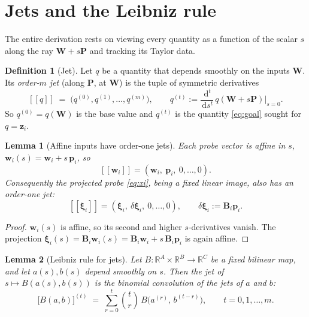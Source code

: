 \documentclass[11pt]{article}
\newcommand{\R}{\mathbb{R}}
\newcommand{\jet}[1]{[\![ #1 ]\!]}   %
\newcommand{\dd}[1]{\,\mathrm{d}#1}
\theoremstyle{definition}
\newtheorem{definition}{Definition}
\theoremstyle{plain}
\newtheorem{lemma}{Lemma}
\begin{document}
\section{Jets and the Leibniz rule}
\label{sec:jets}

The entire derivation rests on viewing every quantity as a function of the scalar $s$ along the ray
$\mathbf W + s\mathbf P$ and tracking its Taylor data.

\begin{definition}[Jet]
\label{def:jet}
Let $q$ be a quantity that depends smoothly on the inputs $\mathbf W$. Its \emph{order-$m$ jet}
(along $\mathbf P$, at $\mathbf W$) is the tuple of symmetric derivatives
\[
  \jet{q} \;=\; \big(q^{(0)}, q^{(1)}, \dots, q^{(m)}\big),
  \qquad
  q^{(t)} := \frac{\dd{^t}}{\dd s^t}\, q(\mathbf W + s\mathbf P)\Big|_{s=0}.
\]
So $q^{(0)} = q(\mathbf W)$ is the base value and $q^{(t)}$ is the quantity \eqref{eq:goal} sought
for $q = \mathbf z_i$.
\end{definition}

\begin{lemma}[Affine inputs have order-one jets]
\label{lem:affine}
Each probe vector is affine in $s$, $\mathbf w_i(s) = \mathbf w_i + s\,\mathbf p_i$, so
\[
  \jet{\mathbf w_i} = (\mathbf w_i,\ \mathbf p_i,\ 0, \dots, 0).
\]
Consequently the projected probe \eqref{eq:xi}, being a fixed linear image, also has an order-one
jet:
\[
  \jet{\boldsymbol\xi_i} = (\boldsymbol\xi_i,\ \delta\boldsymbol\xi_i,\ 0, \dots, 0),
  \qquad \delta\boldsymbol\xi_i := \mathbf B_i \mathbf p_i.
\]
\end{lemma}

\begin{proof}
$\mathbf w_i(s)$ is affine, so its second and higher $s$-derivatives vanish. The projection
$\boldsymbol\xi_i(s) = \mathbf B_i \mathbf w_i(s) = \mathbf B_i \mathbf w_i + s\,\mathbf B_i \mathbf
p_i$ is again affine.
\end{proof}

\begin{lemma}[Leibniz rule for jets]
\label{lem:leibniz}
Let $B : \R^{A} \times \R^{B} \to \R^{C}$ be a fixed bilinear map, and let $a(s), b(s)$ depend
smoothly on $s$. Then the jet of $s \mapsto B(a(s), b(s))$ is the binomial convolution of the jets of
$a$ and $b$:
\begin{equation}
  \label{eq:leibniz}
  \big[B(a,b)\big]^{(t)} \;=\; \sum_{r=0}^{t} \binom{t}{r}\, B\!\big(a^{(r)},\, b^{(t-r)}\big),
  \qquad t = 0, 1, \dots, m.
\end{equation}
\end{lemma}
\end{document}
